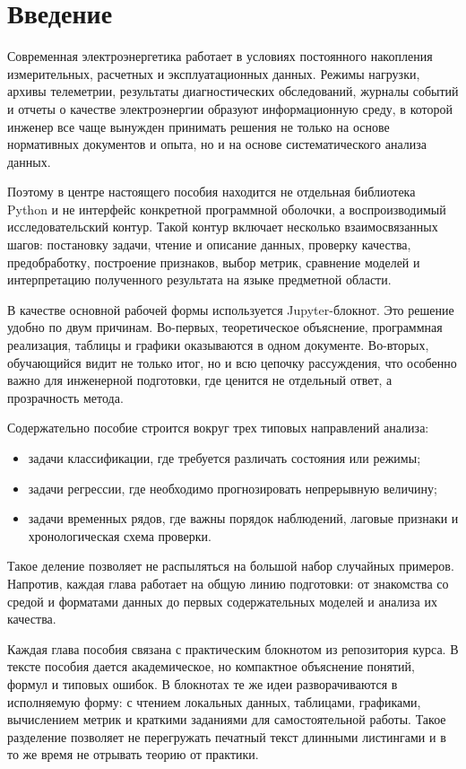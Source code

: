 \chapter*{Введение}

Современная электроэнергетика работает в условиях постоянного накопления измерительных, расчетных и эксплуатационных данных. Режимы нагрузки, архивы телеметрии, результаты диагностических обследований, журналы событий и отчеты о качестве электроэнергии образуют информационную среду, в которой инженер все чаще вынужден принимать решения не только на основе нормативных документов и опыта, но и на основе систематического анализа данных.

Поэтому в центре настоящего пособия находится не отдельная библиотека Python и не интерфейс конкретной программной оболочки, а воспроизводимый исследовательский контур. Такой контур включает несколько взаимосвязанных шагов: постановку задачи, чтение и описание данных, проверку качества, предобработку, построение признаков, выбор метрик, сравнение моделей и интерпретацию полученного результата на языке предметной области.

В качестве основной рабочей формы используется Jupyter-блокнот. Это решение удобно по двум причинам. Во-первых, теоретическое объяснение, программная реализация, таблицы и графики оказываются в одном документе. Во-вторых, обучающийся видит не только итог, но и всю цепочку рассуждения, что особенно важно для инженерной подготовки, где ценится не отдельный ответ, а прозрачность метода.

Содержательно пособие строится вокруг трех типовых направлений анализа:
\begin{itemize}[leftmargin=1.25cm]
\item задачи классификации, где требуется различать состояния или режимы;
\item задачи регрессии, где необходимо прогнозировать непрерывную величину;
\item задачи временных рядов, где важны порядок наблюдений, лаговые признаки и хронологическая схема проверки.
\end{itemize}

Такое деление позволяет не распыляться на большой набор случайных примеров. Напротив, каждая глава работает на общую линию подготовки: от знакомства со средой и форматами данных до первых содержательных моделей и анализа их качества.

Каждая глава пособия связана с практическим блокнотом из репозитория курса. В тексте пособия дается академическое, но компактное объяснение понятий, формул и типовых ошибок. В блокнотах те же идеи разворачиваются в исполняемую форму: с чтением локальных данных, таблицами, графиками, вычислением метрик и краткими заданиями для самостоятельной работы. Такое разделение позволяет не перегружать печатный текст длинными листингами и в то же время не отрывать теорию от практики.

